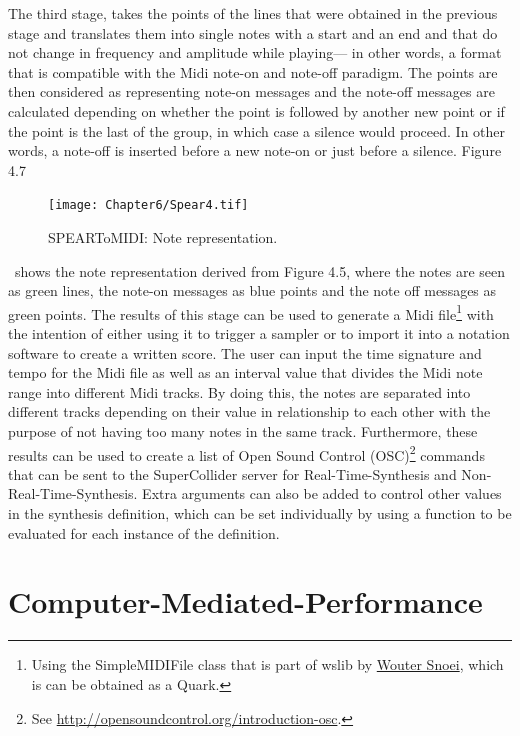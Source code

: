 The third stage, takes the points of the lines that were obtained in the previous stage and translates them into single notes with a start and an end and that do not change in frequency and amplitude while playing--- in other words, a format that is compatible with the Midi note-on and note-off paradigm. The points are then considered as representing note-on messages and the note-off messages are calculated depending on whether the point is followed by another new point or if the point is the last of the group, in which case a silence would proceed. In other words, a note-off is inserted before a new note-on or just before a silence. Figure 4.7 
\begin{figure}[htbp] %
   \centering
   \texttt{[image: Chapter6/Spear4.tif]} %
   \caption{SPEARToMIDI: Note representation.}
   \label{fig:example}
\end{figure}\
shows the note representation derived from Figure 4.5, where the notes are seen as green lines, the note-on messages as blue points and the note off messages as green points. 
The results of this stage can be used to generate a Midi file\hypertarget{wlib}{}\footnote{Using the SimpleMIDIFile class that is part of wslib by \href{http://www.woutersnoei.nl/}{Wouter Snoei}, which is can be obtained as a Quark.} with the intention of either using it to trigger a sampler or to import it into a notation software to create a written score. The user can input the time signature and tempo for the Midi file as well as an interval value that divides the Midi note range into different Midi tracks. By doing this, the notes are separated into different tracks depending on their value in relationship to each other with the purpose of not having too many notes in the same track. Furthermore, these results can be used to create a list of Open Sound Control (OSC)\footnote{See \href{http://opensoundcontrol.org/introduction-osc}{http://opensoundcontrol.org/introduction-osc}.} commands that can be sent to the SuperCollider server for Real-Time-Synthesis and Non-Real-Time-Synthesis. Extra arguments can also be added to control other values in the synthesis definition, which can be set individually by using a function to be evaluated for each instance of the definition.

\section{Computer-Mediated-Performance}

